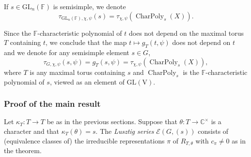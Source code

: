 \documentclass[12pt, reqno]{amsart}
\newtheorem{lemma}[theorem]{Lemma}
\newtheorem{corollary}[theorem]{Corollary}
\theoremstyle{definition}
\theoremstyle{definition}
\theoremstyle{definition}
\newcommand{\cComplex}{\mathbb{C}}
\newcommand{\multiplicativegroup}[1]{#1^{\times}}
\newcommand{\hermitianSpace}{\mathrm{V}}
\newcommand{\fieldCharacter}{\psi}
\newcommand{\GL}{\mathrm{GL}}
\newcommand{\finiteField}{\mathbb{F}}
\newcommand{\LusztigSeries}[2]{\mathcal{E}\left(#1, (#2)\right)}
\newcommand{\ToriDualToriIsomorphism}{\kappa}
\newcommand{\characteristicPolynomial}{\operatorname{CharPoly}}
\newcommand{\calvin}[1]{\textcolor{orange}{\sffamily ((CALVIN: #1))}}
\begin{document}
If $s \in \GL_n\left(\finiteField\right)$ is semisimple, we denote $$\tau_{\GL_n\left(\finiteField\right), \chi, \fieldCharacter}\left(s\right) = \tau_{\chi, \fieldCharacter}\left(\characteristicPolynomial_s\left(X\right)\right).$$

Since the $\finiteField$-characteristic polynomial of $t$ does not depend on the maximal torus $T$ containing $t$, we conclude that the map $t \mapsto g_T\left(t, \fieldCharacter\right)$ does not depend on $t$ and we denote for any semisimple element $s \in G$, $$\tau_{G, \chi, \fieldCharacter}\left(s, \fieldCharacter\right) = g_T\left(s, \fieldCharacter\right) = \tau_{\chi, \fieldCharacter}\left(\characteristicPolynomial_{s}\left(X\right)\right),$$
where $T$ is any maximal torus containing $s$ and $\characteristicPolynomial_{s}$ is the $\finiteField$-characteristic polynomial of $s$, viewed as an element of $\GL\left(\hermitianSpace\right)$.

\subsubsection{Proof of the main result}

\begin{comment}
\calvin{here is the geometric idea:}
\begin{lemma}
    Let $\mathcal{F} := \mathcal{L}(\theta) \otimes tr^{*}\mathcal{L}(\psi)$. Then
    \[
        dim H_c^i(T,\mathcal{F}) = \begin{cases}
        0    & i \neq dim(T) \\
        1    & i = dim(T)
        \end{cases}
    \]
\end{lemma}
\calvin{Might exist in literature somewhere otherwise is a little bit of a pain. It should be analogous to the fact that the Guass sum on a field of size $p^d$ is of magnitude $\sqrt{p^d}$.}
Combining this with Grothendieck-Lefschetz we get
\begin{corollary}
	$g_T(\theta,\psi)^k = g_T(\theta \circ Nm_{k:1},tr_{k:1} \circ \psi)$.
\end{corollary}
\calvin{there might be a simple non-geometric way to do this corollary not sure.}
\calvin{The corollary plus the definition of geometric conjugacy imply $g_T(\theta,\psi) = \mu_kg_{T'}(\theta',\psi)$ for some $k$-th root of unity $\mu_k$. Not sure how to finish from here.}
\end{comment}
Let $\ToriDualToriIsomorphism_T \colon \widehat{T} \to T$ be as in the previous sections. Suppose that $\theta \colon T \to \multiplicativegroup{\cComplex}$ is a character and that $\ToriDualToriIsomorphism_T\left(\theta\right) = s$. The \emph{Lusztig series} $\LusztigSeries{G}{s}$ consists of (equivalence classes of) the irreducible representations $\pi$ of $R_{T, \theta}$ with $c_{\pi} \ne 0$ as in the theorem.
\end{document}
